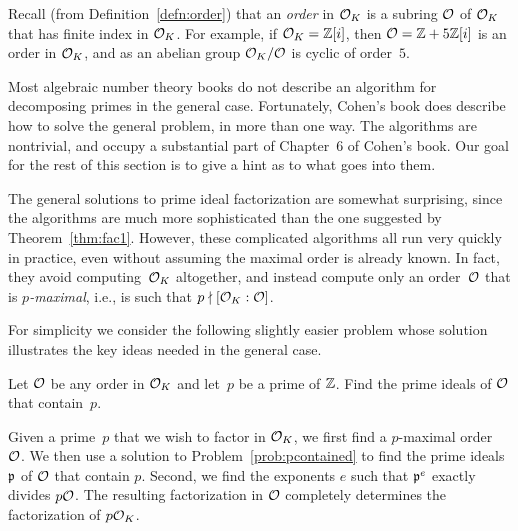 Recall (from Definition~\ref{defn:order}) that an {\em order} in $\mathcal{O}_K$ is
a subring $\mathcal{O}$ of $\mathcal{O}_K$ that has finite index in $\mathcal{O}_K$.  For
example, if $\mathcal{O}_K=\mathbb{Z}[i]$, then $\mathcal{O}=\mathbb{Z} + 5\mathbb{Z}[i]$ is an order in $\mathcal{O}_K$,
and as an abelian group $\mathcal{O}_K/\mathcal{O}$ is cyclic of order~$5$.

Most algebraic number theory books do not describe an algorithm for
decomposing primes in the general case.  Fortunately, Cohen's book
\cite[Ch.~6]{cohen:course_ant} does describe how to solve the general
problem, in more than one way.  The algorithms are nontrivial, and
occupy a substantial part of Chapter~6 of Cohen's book.  Our goal
for the rest of this section is to give a hint as to what goes into them.

The general solutions to prime ideal factorization are somewhat surprising,
since the algorithms are much more sophisticated than the one
suggested by Theorem~\ref{thm:fac1}.  However, these complicated
algorithms all run very quickly in practice, even without assuming the
maximal order is already known.  In fact, they avoid computing~$\mathcal{O}_K$
altogether, and instead compute only an order~$\mathcal{O}$ that is {\em
  $p$-maximal}, i.e., is such that $p \nmid [\mathcal{O}_K:\mathcal{O}]$.

For simplicity we consider the following slightly easier problem whose
solution illustrates the key ideas needed in the general case.
\begin{problem}\label{prob:pcontained}
Let $\mathcal{O}$ be any order in $\mathcal{O}_K$
and let~$p$ be a prime of $\mathbb{Z}$.  Find the prime ideals of $\mathcal{O}$ that
contain~$p$.
\end{problem}

Given a prime~$p$
that we wish to factor in $\mathcal{O}_K$, we first find a $p$-maximal order~$\mathcal{O}$.
We then use a solution to Problem~\ref{prob:pcontained} to find
the prime ideals $\mathfrak{p}$ of $\mathcal{O}$ that contain $p$.  Second, we find
the exponents $e$ such that $\mathfrak{p}^e$ exactly divides $p\mathcal{O}$.
The resulting factorization in $\mathcal{O}$ completely determines
the factorization of $p\mathcal{O}_K$.

